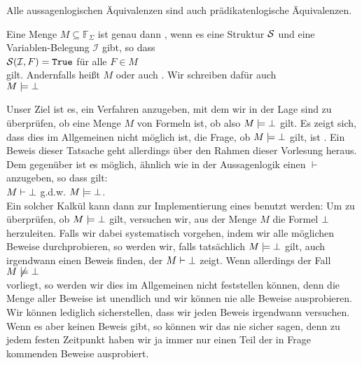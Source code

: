 \remarks
Alle aussagenlogischen Äquivalenzen sind auch prädikatenlogische Äquivalenzen.
\eox

\begin{Definition}[Erfüllbar]
    Eine Menge $M \subseteq \mathbb{F}_\Sigma$ ist genau dann ,
    wenn es eine Struktur $\mathcal{S}$ und eine Variablen-Belegung $\mathcal{I}$ gibt, so dass 
    \\[0.2cm]
    \hspace*{1.3cm}
    $\mathcal{S}(\mathcal{I},F) = \mathtt{True}$ \quad für alle $F \in M$ 
    \\[0.2cm]
    gilt.  Andernfalls heißt $M$  oder auch .
    Wir schreiben dafür auch \\[0.2cm]
    \hspace*{1.3cm} $M \models \bot$ 
    \eox
\end{Definition}

\noindent
Unser Ziel ist es, ein Verfahren anzugeben, mit dem wir in der Lage sind zu überprüfen,
ob eine Menge $M$ von Formeln  ist, ob also 
 $M \models \bot$ gilt.  Es zeigt sich, dass dies im Allgemeinen nicht
möglich ist, die Frage, ob $M \models \bot$ gilt, ist .  Ein Beweis
dieser Tatsache geht allerdings über den Rahmen dieser Vorlesung heraus.
Dem gegenüber ist es möglich, ähnlich wie in der Aussagenlogik
einen  $\vdash$ anzugeben, so dass gilt: \\[0.2cm]
\hspace*{1.3cm} $M \vdash \bot$ \quad g.d.w. \quad $M \models \bot$. \\[0.2cm]
Ein solcher Kalkül kann dann zur Implementierung eines
 benutzt werden:  Um zu überprüfen, ob
$M \models \bot$ gilt, versuchen wir, aus der Menge $M$ die Formel $\bot$
herzuleiten.  
Falls wir dabei systematisch vorgehen, indem wir alle möglichen Beweise durchprobieren,
so werden wir, falls tatsächlich $M \models \bot$ gilt, auch irgendwann einen Beweis
finden, der $M \vdash \bot$ zeigt.   Wenn allerdings der Fall \\[0.2cm]
\hspace*{1.3cm}  $M \not\models \bot$ \\[0.2cm]
vorliegt,  so werden wir dies im Allgemeinen nicht feststellen können, denn die Menge aller Beweise ist unendlich 
und wir können nie alle Beweise ausprobieren.  Wir können lediglich sicherstellen, dass
wir jeden Beweis irgendwann versuchen.  Wenn es aber keinen Beweis gibt, so können wir das
nie sicher sagen, denn zu jedem festen Zeitpunkt haben wir ja immer nur einen Teil der in
Frage kommenden Beweise ausprobiert.

